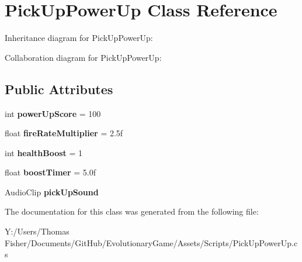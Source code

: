\hypertarget{class_pick_up_power_up}{}\section{Pick\+Up\+Power\+Up Class Reference}
\label{class_pick_up_power_up}


Inheritance diagram for Pick\+Up\+Power\+Up\+:


Collaboration diagram for Pick\+Up\+Power\+Up\+:
\subsection*{Public Attributes}
\begin{DoxyCompactItemize}
\item 
\mbox{\label{class_pick_up_power_up_a7ae524c7a44e70274c7c767518efe757}} 
int {\bfseries power\+Up\+Score} = 100
\item 
\mbox{\label{class_pick_up_power_up_af31fa062fa0b10ffce7ce6799ca58827}} 
float {\bfseries fire\+Rate\+Multiplier} = 2.\+5f
\item 
\mbox{\label{class_pick_up_power_up_ac026faee3bf9fe7d7a9066030e909a60}} 
int {\bfseries health\+Boost} = 1
\item 
\mbox{\label{class_pick_up_power_up_a77c6017483939ae8eae6fd0c5933e55b}} 
float {\bfseries boost\+Timer} = 5.\+0f
\item 
\mbox{\label{class_pick_up_power_up_a63055db7773732a7cd3e7729a91186a6}} 
Audio\+Clip {\bfseries pick\+Up\+Sound}
\end{DoxyCompactItemize}


The documentation for this class was generated from the following file\+:\begin{DoxyCompactItemize}
\item 
Y\+:/\+Users/\+Thomas Fisher/\+Documents/\+Git\+Hub/\+Evolutionary\+Game/\+Assets/\+Scripts/Pick\+Up\+Power\+Up.\+cs\end{DoxyCompactItemize}
